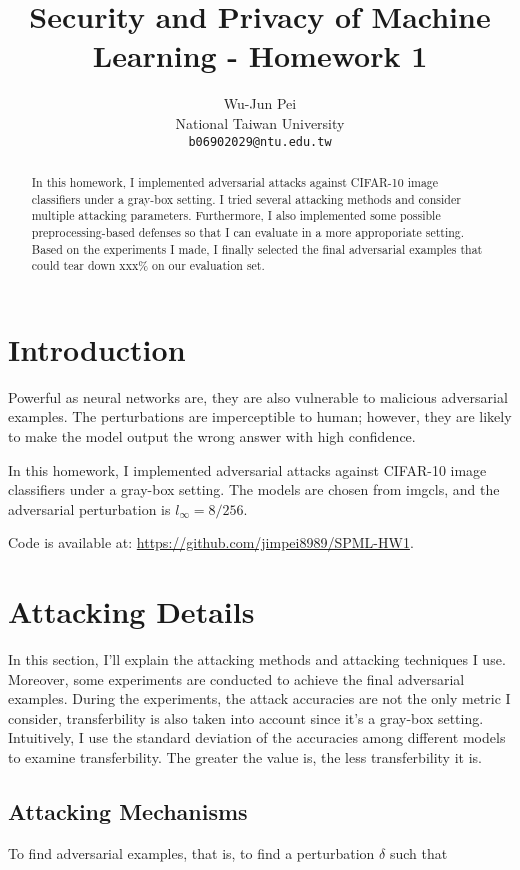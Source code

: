 \documentclass{article}
\title{Security and Privacy of Machine Learning - Homework 1}
\author{
  Wu-Jun Pei\\
  National Taiwan University\\
  \texttt{b06902029@ntu.edu.tw} \\
}
\begin{document}
\maketitle

\begin{abstract}
  In this homework, I implemented adversarial attacks against CIFAR-10 image classifiers under a gray-box setting. I tried several attacking methods and consider multiple attacking parameters. Furthermore, I also implemented some possible preprocessing-based defenses so that I can evaluate in a more approporiate setting. Based on the experiments I made, I finally selected the final adversarial examples that could tear down xxx\% on our evaluation set.
\end{abstract}

\section{Introduction}
Powerful as neural networks are, they are also vulnerable to malicious adversarial examples. The perturbations are imperceptible to human; however, they are likely to make the model output the wrong answer with high confidence.

In this homework, I implemented adversarial attacks against CIFAR-10 image classifiers under a gray-box
setting. The models are chosen from imgcls\cite{imgcls}, and the adversarial perturbation is $l_{\infty} = 8 / 256$.

Code is available at: \url{https://github.com/jimpei8989/SPML-HW1}.

\section{Attacking Details}
In this section, I'll explain the attacking methods and attacking techniques I use. Moreover, some experiments are conducted to achieve the final adversarial examples. During the experiments, the attack accuracies are not the only metric I consider, transferbility is also taken into account since it's a gray-box setting. Intuitively, I use the standard deviation of the accuracies among different models to examine transferbility. The greater the value is, the less transferbility it is.

\subsection{Attacking Mechanisms}

To find adversarial examples, that is, to find a perturbation $\delta$ such that
\end{document}
